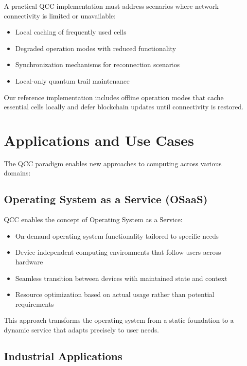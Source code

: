 \documentclass[11pt,a4paper]{article}
\begin{document}
A practical QCC implementation must address scenarios where network connectivity is limited or unavailable:

\begin{itemize}
    \item Local caching of frequently used cells
    \item Degraded operation modes with reduced functionality
    \item Synchronization mechanisms for reconnection scenarios
    \item Local-only quantum trail maintenance
\end{itemize}

Our reference implementation includes offline operation modes that cache essential cells locally and defer blockchain updates until connectivity is restored.

\section{Applications and Use Cases}

The QCC paradigm enables new approaches to computing across various domains:

\subsection{Operating System as a Service (OSaaS)}

QCC enables the concept of Operating System as a Service:

\begin{itemize}
    \item On-demand operating system functionality tailored to specific needs
    \item Device-independent computing environments that follow users across hardware
    \item Seamless transition between devices with maintained state and context
    \item Resource optimization based on actual usage rather than potential requirements
\end{itemize}

This approach transforms the operating system from a static foundation to a dynamic service that adapts precisely to user needs.

\subsection{Industrial Applications}
\end{document}
